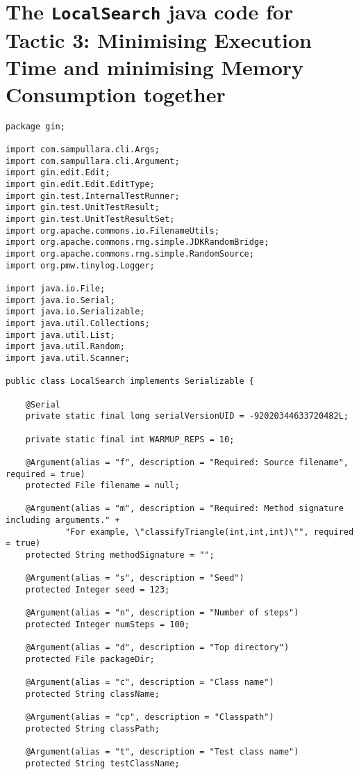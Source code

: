 \section{The \texttt{LocalSearch} java code for Tactic 3: Minimising Execution Time and minimising Memory Consumption together}\label{sec:LocalSearch_Time_Memory}

\begin{lstlisting}
package gin;

import com.sampullara.cli.Args;
import com.sampullara.cli.Argument;
import gin.edit.Edit;
import gin.edit.Edit.EditType;
import gin.test.InternalTestRunner;
import gin.test.UnitTestResult;
import gin.test.UnitTestResultSet;
import org.apache.commons.io.FilenameUtils;
import org.apache.commons.rng.simple.JDKRandomBridge;
import org.apache.commons.rng.simple.RandomSource;
import org.pmw.tinylog.Logger;

import java.io.File;
import java.io.Serial;
import java.io.Serializable;
import java.util.Collections;
import java.util.List;
import java.util.Random;
import java.util.Scanner;

public class LocalSearch implements Serializable {

    @Serial
    private static final long serialVersionUID = -92020344633720482L;

    private static final int WARMUP_REPS = 10;

    @Argument(alias = "f", description = "Required: Source filename", required = true)
    protected File filename = null;

    @Argument(alias = "m", description = "Required: Method signature including arguments." +
            "For example, \"classifyTriangle(int,int,int)\"", required = true)
    protected String methodSignature = "";

    @Argument(alias = "s", description = "Seed")
    protected Integer seed = 123;

    @Argument(alias = "n", description = "Number of steps")
    protected Integer numSteps = 100;

    @Argument(alias = "d", description = "Top directory")
    protected File packageDir;

    @Argument(alias = "c", description = "Class name")
    protected String className;

    @Argument(alias = "cp", description = "Classpath")
    protected String classPath;

    @Argument(alias = "t", description = "Test class name")
    protected String testClassName;


\end{lstlisting}
